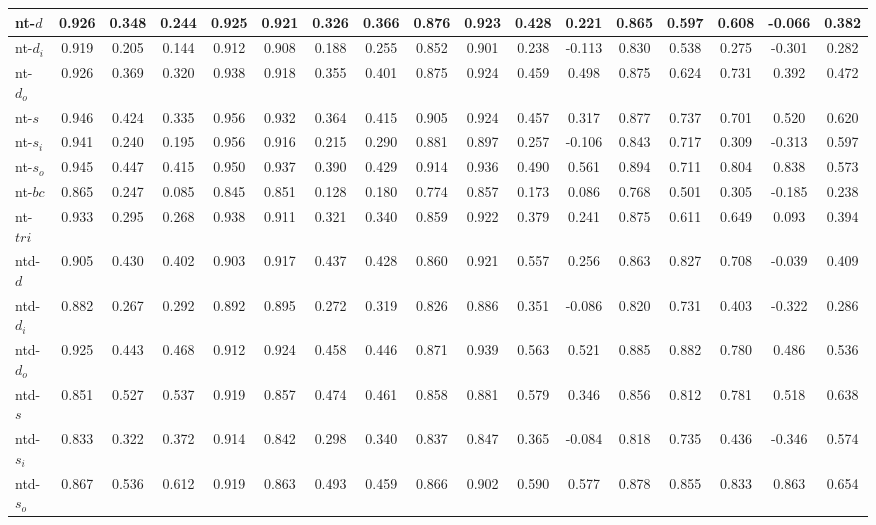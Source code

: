 \documentclass[%
 aip,
 jmp,%
 amsmath,amssymb,
 reprint,%
]{revtex4-1}
\begin{document}
\begin{longtable*}{|p{2cm}|| c|c|c|c|| c|c|c|c|| c|c|c|c|| c|c|c|c|}
nt-$d$ & 0.926 & 0.348 & 0.244 & 0.925 & 0.921 & 0.326 & 0.366 & 0.876 & 0.923 & 0.428 & 0.221 & 0.865 & 0.597 & 0.608 & -0.066 & 0.382 \\ \hline
nt-$d_i$ & 0.919 & 0.205 & 0.144 & 0.912 & 0.908 & 0.188 & 0.255 & 0.852 & 0.901 & 0.238 & -0.113 & 0.830 & 0.538 & 0.275 & -0.301 & 0.282 \\ \hline
nt-$d_o$ & 0.926 & 0.369 & 0.320 & 0.938 & 0.918 & 0.355 & 0.401 & 0.875 & 0.924 & 0.459 & 0.498 & 0.875 & 0.624 & 0.731 & 0.392 & 0.472 \\ \hline
nt-$s$ & 0.946 & 0.424 & 0.335 & 0.956 & 0.932 & 0.364 & 0.415 & 0.905 & 0.924 & 0.457 & 0.317 & 0.877 & 0.737 & 0.701 & 0.520 & 0.620 \\ \hline
nt-$s_i$ & 0.941 & 0.240 & 0.195 & 0.956 & 0.916 & 0.215 & 0.290 & 0.881 & 0.897 & 0.257 & -0.106 & 0.843 & 0.717 & 0.309 & -0.313 & 0.597 \\ \hline
nt-$s_o$ & 0.945 & 0.447 & 0.415 & 0.950 & 0.937 & 0.390 & 0.429 & 0.914 & 0.936 & 0.490 & 0.561 & 0.894 & 0.711 & 0.804 & 0.838 & 0.573 \\ \hline
nt-$bc$ & 0.865 & 0.247 & 0.085 & 0.845 & 0.851 & 0.128 & 0.180 & 0.774 & 0.857 & 0.173 & 0.086 & 0.768 & 0.501 & 0.305 & -0.185 & 0.238 \\ \hline
nt-$tri$ & 0.933 & 0.295 & 0.268 & 0.938 & 0.911 & 0.321 & 0.340 & 0.859 & 0.922 & 0.379 & 0.241 & 0.875 & 0.611 & 0.649 & 0.093 & 0.394 \\ \hline
ntd-$d$ & 0.905 & 0.430 & 0.402 & 0.903 & 0.917 & 0.437 & 0.428 & 0.860 & 0.921 & 0.557 & 0.256 & 0.863 & 0.827 & 0.708 & -0.039 & 0.409 \\ \hline
ntd-$d_i$ & 0.882 & 0.267 & 0.292 & 0.892 & 0.895 & 0.272 & 0.319 & 0.826 & 0.886 & 0.351 & -0.086 & 0.820 & 0.731 & 0.403 & -0.322 & 0.286 \\ \hline
ntd-$d_o$ & 0.925 & 0.443 & 0.468 & 0.912 & 0.924 & 0.458 & 0.446 & 0.871 & 0.939 & 0.563 & 0.521 & 0.885 & 0.882 & 0.780 & 0.486 & 0.536 \\ \hline
ntd-$s$ & 0.851 & 0.527 & 0.537 & 0.919 & 0.857 & 0.474 & 0.461 & 0.858 & 0.881 & 0.579 & 0.346 & 0.856 & 0.812 & 0.781 & 0.518 & 0.638 \\ \hline
ntd-$s_i$ & 0.833 & 0.322 & 0.372 & 0.914 & 0.842 & 0.298 & 0.340 & 0.837 & 0.847 & 0.365 & -0.084 & 0.818 & 0.735 & 0.436 & -0.346 & 0.574 \\ \hline
ntd-$s_o$ & 0.867 & 0.536 & 0.612 & 0.919 & 0.863 & 0.493 & 0.459 & 0.866 & 0.902 & 0.590 & 0.577 & 0.878 & 0.855 & 0.833 & 0.863 & 0.654 \\ \hline

\end{longtable*}
\end{document}
